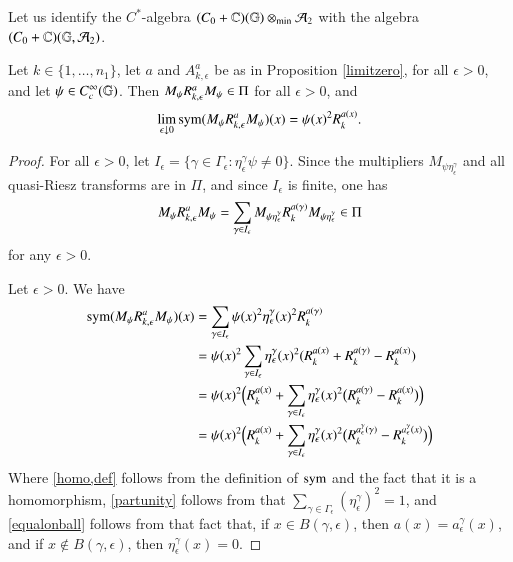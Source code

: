 \documentclass[leqno]{amsart}
\begin{document}
	
	
	
	
	
	
	Let us identify the $C^{*}$-algebra $(C_{0}+\mathbb{C})(\mathbb{G})\otimes_{\rm min}{\mathcal A}_{2}$ with the algebra $(C_{0}+\mathbb{C})(\mathbb{G},{\mathcal A}_{2})$.
	\begin{proposition}\label{limitpsiriesz}
		Let $k\in\{1, \hdots, n_1\}$, let $a$ and $A^{a}_{k,\epsilon}$ be as in Proposition \ref{limitzero}, for all $\epsilon>0$, and let $\psi\in C_{c}^{\infty}(\mathbb{G})$. Then $M_{\psi}{ R}^{a}_{k,\epsilon}M_{\psi}\in\Pi$ for all $\epsilon>0$, and
		$$\lim_{\epsilon\downarrow0}{\rm sym}(M_{\psi}{ R}^{a}_{k,\epsilon}M_{\psi})(x)=\psi(x)^{2} { R}^{a(x)}_{k}.$$
	\end{proposition}
	
	\begin{proof}
		For all $\epsilon>0$, let $I_{\epsilon}=\{\gamma\in\Gamma_\epsilon:\eta^\gamma_\epsilon\psi\neq 0\}$. Since the multipliers $M_{\psi\eta^\gamma_\epsilon}$ and all quasi-Riesz transforms are in $\Pi$, and since $I_\epsilon$ is finite, one has
		\begin{align}\label{finitesum}
			M_{\psi}{ R}^{a}_{k,\epsilon}M_{\psi}=\sum_{\gamma\in I_{\epsilon}}
			M_{\psi\eta^\gamma_\epsilon}R_{k}^{a(\gamma)}M_{\psi\eta^\gamma_\epsilon}\in\Pi
		\end{align}
		for any $\epsilon>0$.
		
		Let $\epsilon>0$. We have
		\begin{align}
			\label{homo,def} {\rm sym}(M_{\psi}{ R}^{a}_{k,\epsilon}M_{\psi})(x)
			&=\sum_{\gamma\in I_\epsilon}\psi(x)^{2}\eta^\gamma_\epsilon(x)^{2}R_{k}^{a(\gamma)}\\
   \nonumber&=\psi(x)^{2}\sum_{\gamma\in I_\epsilon}\eta^\gamma_\epsilon(x)^{2}(R_{k}^{a(x)}+R_{k}^{a(\gamma)}-R_{k}^{a(x)})\\
			\label{partunity}    &=\psi(x)^{2}\Bigl(R^{a(x)}_k+\sum_{\gamma\in I_\epsilon}\eta^\gamma_\epsilon(x)^{2}\bigl(R_{k}^{a(\gamma)}-R_{k}^{a(x)}\bigr)\Bigr)\\
			\label{equalonball}    &=\psi(x)^{2}\Bigl(R^{a(x)}_k+\sum_{\gamma\in I_\epsilon}\eta^\gamma_\epsilon(x)^{2}\bigl(R_{k}^{a^\gamma_\epsilon(\gamma)}-R_{k}^{a^\gamma_\epsilon(x)}\bigr)\Bigr)
		\end{align}
		Where \eqref{homo,def} follows from the definition of ${\rm sym}$ and the fact that it is a homomorphism, \eqref{partunity} follows from that $\sum_{\gamma\in\Gamma_\epsilon}(\eta^\gamma_\epsilon)^2=1$, and \eqref{equalonball} follows from that fact that, if $x\in B(\gamma, \epsilon)$, then $a(x)=a^\gamma_\epsilon(x)$, and if $x\notin B(\gamma,\epsilon)$, then $\eta^\gamma_\epsilon(x)=0$.
		

\end{proof}
\end{document}
